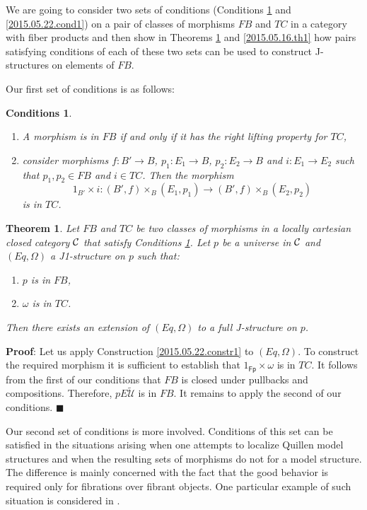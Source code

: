 \documentclass[12pt]{article}
\numberwithin{equation}{section}
\newenvironment{myproof}{{\bf Proof}:}{$\blacksquare$ \vskip 5mm }
\newtheorem{theorem}[proposition]{Theorem}
\newtheorem{cond}[proposition]{Conditions}
\newcommand{\llabel}[1]{\label{#1}}
\newcommand{\sr}{\rightarrow}
\newcommand{\wt}{\widetilde}
\newcommand{\id}{1}            %
\newcommand{\U}{\mathcal{U}}
\newcommand{\Fp}{\mathsf{Fp}}
\begin{document}
We are going to consider two sets of conditions (Conditions
\ref{2015.05.22.cond2} and \ref{2015.05.22.cond1}) on a pair of classes of
morphisms $FB$ and $TC$ in a category with fiber products and then show in
Theorems \ref{2015.05.22.th1} and \ref{2015.05.16.th1} how pairs satisfying
conditions of each of these two sets can be used to construct J-structures on
elements of $FB$.

Our first set of conditions is as follows:
%
\begin{cond}\llabel{2015.05.22.cond2}
\begin{enumerate}
\item A morphism is in $FB$ if and only if it has the right lifting property
  for $TC$,
\item consider morphisms $f: B'\sr B$, $p_1:E_1\sr B$, $p_2:E_2\sr B$ and
  $i:E_1\sr E_2$ such that $p_1,p_2\in FB$ and $i\in TC$. Then the morphism
%
$$\id_{B'}\times i: (B',f)\times_B(E_1,p_1)\sr (B',f)\times_B(E_2,p_2)$$
%
is in $TC$.
\end{enumerate}
\end{cond}
%
\begin{theorem}
\llabel{2015.05.22.th1} Let $FB$ and $TC$ be two classes of morphisms in a
locally cartesian closed category $\cal C$ that satisfy Conditions
\ref{2015.05.22.cond2}. Let $p$ be a universe in $\cal C$ and $(Eq,\Omega)$ a
J1-structure on $p$ such that:
%
\begin{enumerate}
\item $p$ is in $FB$,
\item $\omega$ is in $TC$.
\end{enumerate}
%
Then there exists an extension of $(Eq,\Omega)$ to a full J-structure on $p$.
\end{theorem}
%
\begin{myproof}
Let us apply Construction \ref{2015.05.22.constr1} to $(Eq,\Omega)$. To
construct the required morphism it is sufficient to establish that
$\id_{\Fp}\times\omega$ is in $TC$. It follows from the first of our conditions
that $FB$ is closed under pullbacks and compositions. Therefore, $pE\wt{\U}$ is
in $FB$. It remains to apply the second of our conditions.
\end{myproof}
% 





Our second set of conditions is more involved. Conditions of this set can be
satisfied in the situations arising when one attempts to localize Quillen model
structures and when the resulting sets of morphisms do not for a model
structure. The difference is mainly concerned with the fact that the good
behavior is required only for fibrations over fibrant objects. One particular
example of such situation is considered in \cite[Section 3.3]{SRF}.
\end{document}

